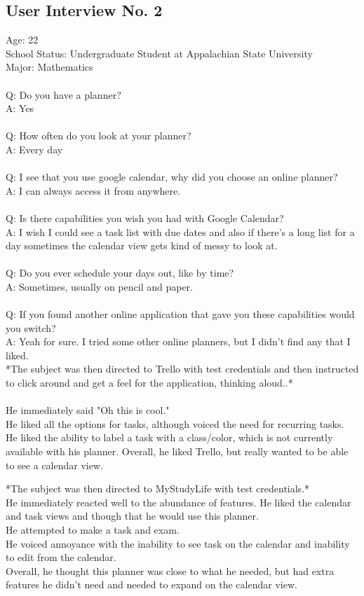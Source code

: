 \subsection{User Interview No. 2}
Age: 22\\
School Status: Undergraduate Student at Appalachian State University \\
Major: Mathematics\\ \\
Q: Do you have a planner?\\
A: Yes \\ \\
Q: How often do you look at your planner?\\
A: Every day\\ \\
Q: I see that you use google calendar, why did you choose an online planner?\\
A: I can always access it from anywhere.\\ \\
Q: Is there capabilities you wish you had with Google Calendar?\\
A: I wish I could see a task list with due dates and also if there’s a long list for a day sometimes the calendar view gets kind of messy to look at.\\ \\
Q: Do you ever schedule your days out, like by time?\\
A: Sometimes, usually on pencil and paper. \\ \\
Q: If you found another online application that gave you these capabilities would you switch?\\
A: Yeah for sure. I tried some other online planners, but I didn’t find any that I liked.\\

*The subject was then directed to Trello with test credentials and then instructed to click around and get a feel for the application, thinking aloud..*\\
\\
He immediately said "Oh this is cool."\\
He liked all the options for tasks, although voiced the need for recurring tasks.\\
He liked the ability to label a task with a class/color, which is not currently available with his planner.
Overall, he liked Trello, but really wanted to be able to see a calendar view.

*The subject was then directed to MyStudyLife with test credentials.*\\
He immediately reacted well to the abundance of features. He liked the calendar and task views and though that he would use this planner.\\
He attempted to make a task and exam.\\
He voiced annoyance with the inability to see task on the calendar and inability to edit from the calendar.\\
Overall, he thought this planner was close to what he needed, but had extra features he didn't need and needed to expand on the calendar view.

